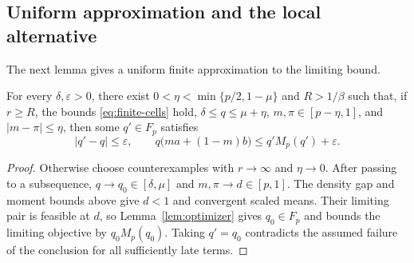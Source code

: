 \subsection{Uniform approximation and the local alternative}

The next lemma gives a uniform finite approximation to the limiting bound.

\begin{lemma}\label{lem:finite-approximation}
For every $\delta,\varepsilon>0$, there exist
$0<\eta<\min\{p/2,1-\mu\}$ and $R>1/\beta$ such
that, if $r\ge R$, the bounds \eqref{eq:finite-cells} hold,
$\delta\le q\le\mu+\eta$, $m,\pi\in[p-\eta,1]$, and
$|m-\pi|\le\eta$, then some $q'\in F_p$ satisfies
\[
 |q'-q|\le\varepsilon,\qquad
 q\bigl(ma+(1-m)b\bigr)\le q'M_p(q')+\varepsilon.
\]
\end{lemma}
\begin{proof}
Otherwise choose counterexamples with $r\to\infty$ and $\eta\to0$.
After passing to a subsequence, $q\to q_0\in[\delta,\mu]$ and
$m,\pi\to d\in[p,1]$. The density gap and moment bounds above give
$d<1$ and convergent scaled means. Their limiting pair is feasible
at $d$, so Lemma~\ref{lem:optimizer} gives $q_0\in F_p$ and bounds the
limiting objective by $q_0M_p(q_0)$. Taking $q'=q_0$ contradicts the
assumed failure of the conclusion for all sufficiently late terms.
\end{proof}

